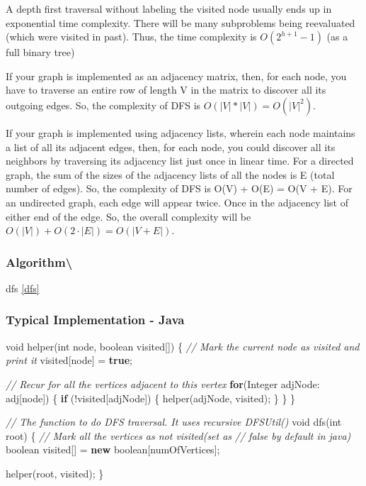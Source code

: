 \documentclass[]{book}
\newenvironment{Shaded}{\begin{snugshade}}{\end{snugshade}}
\newcommand{\BuiltInTok}[1]{#1}
\newcommand{\CommentTok}[1]{\textcolor[rgb]{0.56,0.35,0.01}{\textit{#1}}}
\newcommand{\DataTypeTok}[1]{\textcolor[rgb]{0.13,0.29,0.53}{#1}}
\newcommand{\FunctionTok}[1]{\textcolor[rgb]{0.00,0.00,0.00}{#1}}
\newcommand{\KeywordTok}[1]{\textcolor[rgb]{0.13,0.29,0.53}{\textbf{#1}}}
\newcommand{\NormalTok}[1]{#1}
\begin{document}
A depth first traversal without labeling the visited node usually ends up in exponential time complexity. There will be
many subproblems being reevaluated (which were visited in past). Thus, the time complexity is \(O(2^{h+1} - 1)\) (as a
full binary tree)

If your graph is implemented as an adjacency matrix, then, for each node, you have to traverse an entire row of length
V in the matrix to discover all its outgoing edges. So, the complexity of DFS is \(O(|V| * |V|) = O(|V|^2)\).

If your graph is implemented using adjacency lists, wherein each node maintains a list of all its adjacent edges,
then, for each node, you could discover all its neighbors by traversing its adjacency list just once in linear time.
For a directed graph, the sum of the sizes of the adjacency lists of all the nodes is E (total number of edges). So, the
complexity of DFS is O(V) + O(E) = O(V + E). For an undirected graph, each edge will appear twice. Once in the adjacency
list of either end of the edge. So, the overall complexity will be \(O(|V|) + O (2\cdot |E|) = O(|V + E|)\).

\hypertarget{algorithm-100}{%
\subsubsection{Algorithm\textbackslash{}}\label{algorithm-100}}

dfs \ref{dfs}

\subsubsection{Typical Implementation - Java}

\begin{Shaded}
\begin{Highlighting}[]
\DataTypeTok{void} \FunctionTok{helper}\NormalTok{(}\DataTypeTok{int}\NormalTok{ node, }\DataTypeTok{boolean}\NormalTok{ visited[]) \{}
    \CommentTok{// Mark the current node as visited and print it}
\NormalTok{    visited[node] = }\KeywordTok{true}\NormalTok{;}

    \CommentTok{// Recur for all the vertices adjacent to this vertex}
    \KeywordTok{for}\NormalTok{(}\BuiltInTok{Integer}\NormalTok{ adjNode: adj[node]) \{}
        \KeywordTok{if}\NormalTok{ (!visited[adjNode]) \{}
            \FunctionTok{helper}\NormalTok{(adjNode, visited);}
\NormalTok{        \}}
\NormalTok{    \}}
\NormalTok{\}}

\CommentTok{// The function to do DFS traversal. It uses recursive DFSUtil()}
\DataTypeTok{void} \FunctionTok{dfs}\NormalTok{(}\DataTypeTok{int}\NormalTok{ root) \{}
    \CommentTok{// Mark all the vertices as not visited(set as}
    \CommentTok{// false by default in java)}
    \DataTypeTok{boolean}\NormalTok{ visited[] = }\KeywordTok{new} \DataTypeTok{boolean}\NormalTok{[numOfVertices];}

    \FunctionTok{helper}\NormalTok{(root, visited);}
\NormalTok{\}}
\end{Highlighting}
\end{Shaded}
\end{document}
